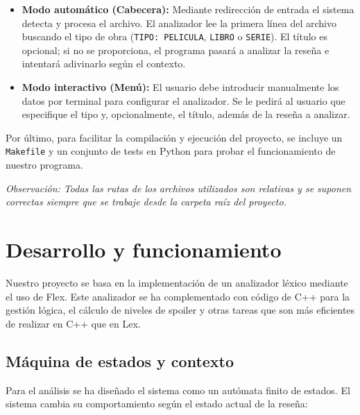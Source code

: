 \documentclass{article}
\begin{document}
\begin{itemize}
    \item \textbf{Modo automático (Cabecera):} Mediante redirección de entrada el sistema detecta y procesa el archivo. El analizador lee la primera línea del archivo buscando el tipo de obra (\texttt{TIPO: PELICULA}, \texttt{LIBRO} o \texttt{SERIE}). El título es opcional; si no se proporciona, el programa pasará a analizar la reseña e intentará adivinarlo según el contexto.
    
    \item \textbf{Modo interactivo (Menú):} El usuario debe introducir manualmente los datos por terminal para configurar el analizador. Se le pedirá al usuario que especifique el tipo y, opcionalmente, el título, además de la reseña a analizar.
\end{itemize}

Por último, para facilitar la compilación y ejecución del proyecto, se incluye un \texttt{Makefile} y un conjunto de tests en Python para probar el funcionamiento de nuestro programa.

\vspace{0.5cm}

\noindent \textit{Observación: Todas las rutas de los archivos utilizados son relativas y se suponen correctas siempre que se trabaje desde la carpeta raíz del proyecto.}



\newpage
\section{Desarrollo y funcionamiento}

Nuestro proyecto se basa en la implementación de un analizador léxico mediante el uso de Flex. Este analizador se ha complementado con código de C++ para la gestión lógica, el cálculo de niveles de spoiler y otras tareas que son más eficientes de realizar en C++ que en Lex.

\subsection{Máquina de estados y contexto}

Para el análisis se ha diseñado el sistema como un autómata finito de estados. El sistema cambia su comportamiento según el estado actual de la reseña:
\end{document}
